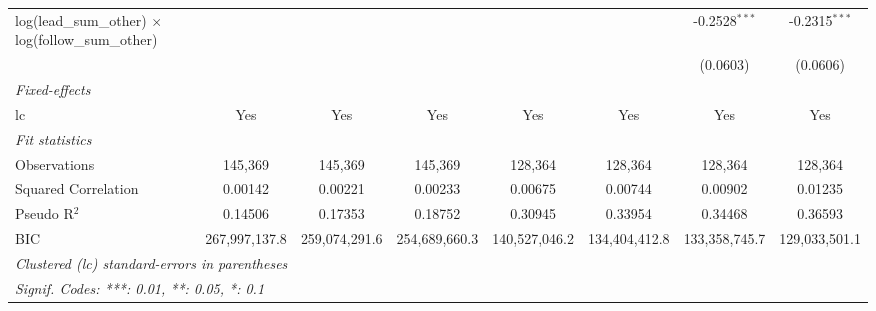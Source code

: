 \begin{tabular}{lccccccc}
   log(lead\_sum\_other) $\times$ log(follow\_sum\_other)      &               &               &                &               &                & -0.2528$^{***}$ & -0.2315$^{***}$\\   
                                                               &               &               &                &               &                & (0.0603)        & (0.0606)\\   
   \midrule
   \emph{Fixed-effects}\\
   lc                                                          & Yes           & Yes           & Yes            & Yes           & Yes            & Yes             & Yes\\  
   \midrule
   \emph{Fit statistics}\\
   Observations                                                & 145,369       & 145,369       & 145,369        & 128,364       & 128,364        & 128,364         & 128,364\\  
   Squared Correlation                                         & 0.00142       & 0.00221       & 0.00233        & 0.00675       & 0.00744        & 0.00902         & 0.01235\\  
   Pseudo R$^2$                                                & 0.14506       & 0.17353       & 0.18752        & 0.30945       & 0.33954        & 0.34468         & 0.36593\\  
   BIC                                                         & 267,997,137.8 & 259,074,291.6 & 254,689,660.3  & 140,527,046.2 & 134,404,412.8  & 133,358,745.7   & 129,033,501.1\\  
   \midrule \midrule
   \multicolumn{8}{l}{\emph{Clustered (lc) standard-errors in parentheses}}\\
   \multicolumn{8}{l}{\emph{Signif. Codes: ***: 0.01, **: 0.05, *: 0.1}}\\
\end{tabular}
\par\endgroup


